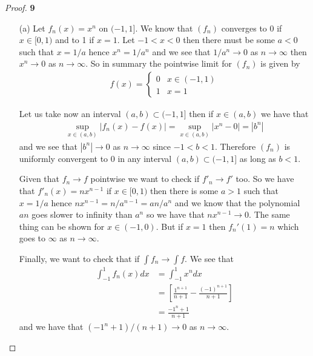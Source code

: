 \documentclass[11pt]{article}
\theoremstyle{definition}
\begin{document}
\begin{proof}{\textbf{9}}
\begin{itemize}
    \item [(a)] Let $f_n(x) = x^n$ on $(-1, 1]$.
    We know that $(f_n)$ converges to 0 if $x \in [0,1)$ and to 1 if $x = 1$.
    Let  $-1 < x < 0$ then there must be some $a < 0$ such that $x = 1/a$
    hence $x^n = 1/a^n$ and we see that $1/a^n \to 0$ as $n \to \infty$ then
    $x^n \to 0$ as $n \to \infty$. So in summary the pointwise limit for $(f_n)$
    is given by
    \begin{align*}
        f(x) = \begin{cases}
        0 & x \in (-1,1)\\
        1 & x = 1
        \end{cases}
    \end{align*}

    Let us take now an interval $(a,b) \subset (-1,1]$ then if $x \in (a,b)$
    we have that
    \begin{align*}
        \sup_{x \in (a,b)}|f_n(x) - f(x)|
        = \sup_{x \in (a,b)}|x^n - 0|
        = |b^n|
    \end{align*}
    and we see that $|b^n| \to 0$ as $n \to \infty$ since $-1 < b < 1$.
    Therefore $(f_n)$ is uniformly convergent to $0$ in any interval
    $(a,b) \subset (-1,1]$ as long as $b < 1$.

    Given that $f_n \to f$ pointwise we want to check if $f'_n \to f'$ too.
    So we have that $f'_n(x) = nx^{n-1}$ if $x \in [0, 1)$
    then there is some $a > 1$ such that $x = 1/a$ hence
    $nx^{n-1} = n/a^{n-1} = an/a^{n}$ and we know that the polynomial $an$
    goes slower to infinity than $a^n$ so we have that $nx^{n-1} \to 0$.
    The same thing can be shown for $x \in (-1,0)$.
    But if $x = 1$ then $f_n'(1) = n$ which goes to $\infty$ as $n \to \infty$.

    Finally, we want to check that if $\int f_n \to \int f$.
    We see that
    \begin{align*}
        \int_{-1}^1 f_n(x) dx &= \int_{-1}^1 x^n dx\\
        &= \left[\frac{1^{n+1}}{n+1} - \frac{(-1)^{n+1}}{n+1}\right]\\
        &=\frac{-1^n + 1}{n + 1}
    \end{align*}
    and we have that $(-1^n + 1)/(n + 1) \to 0$ as $n \to \infty$.


\end{itemize}
\end{proof}
\end{document}
